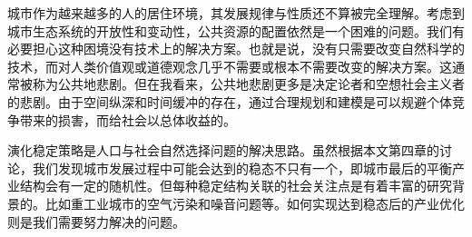 城市作为越来越多的人的居住环境，其发展规律与性质还不算被完全理解。考虑到城市生态系统的开放性和变动性，公共资源的配置依然是一个困难的问题。我们有必要担心这种困境没有技术上的解决方案。也就是说，没有只需要改变自然科学的技术，而对人类价值观或道德观念几乎不需要或根本不需要改变的解决方案\cite{hardin1968tragedy}。这通常被称为公共地悲剧。但在我看来，公共地悲剧更多是决定论者和空想社会主义者的悲剧。由于空间纵深和时间缓冲的存在，通过合理规划和建模是可以规避个体竞争带来的损害，而给社会以总体收益的。

演化稳定策略\cite{PhysRevE.64.051905}是人口与社会自然选择问题\cite{holt1981the}的解决思路。虽然根据本文第四章的讨论，我们发现城市发展过程中可能会达到的稳态不只有一个，即城市最后的平衡产业结构会有一定的随机性。但每种稳定结构关联的社会关注点是有着丰富的研究背景的。比如重工业城市的空气污染和噪音问题等。如何实现达到稳态后的产业优化则是我们需要努力解决的问题。